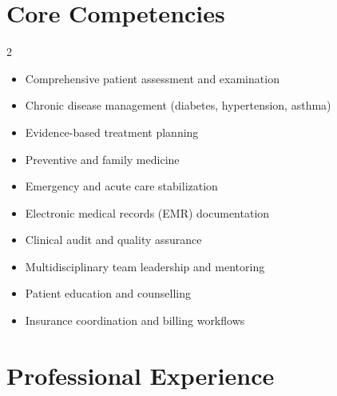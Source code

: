 \documentclass[a4paper,11pt]{article}
\begin{document}
\section*{Core Competencies}
\begin{multicols}{2}
\begin{itemize}[leftmargin=*, topsep=0pt]
    \item Comprehensive patient assessment and examination
    \item Chronic disease management (diabetes, hypertension, asthma)
    \item Evidence-based treatment planning
    \item Preventive and family medicine
    \item Emergency and acute care stabilization
    \item Electronic medical records (EMR) documentation
    \item Clinical audit and quality assurance
    \item Multidisciplinary team leadership and mentoring
    \item Patient education and counselling
    \item Insurance coordination and billing workflows
\end{itemize}
\end{multicols}


\section*{Professional Experience}
\end{document}
